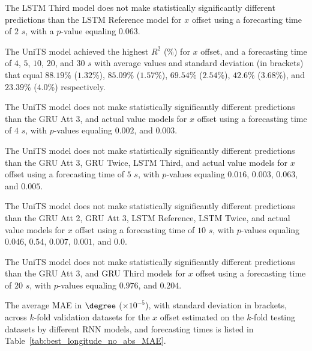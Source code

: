 The LSTM Third model does not make statistically significantly different predictions than the LSTM Reference model for $x$ offset using a forecasting time of $2$ $s$, with a $p$-value equaling $0.063$.

The UniTS model achieved the highest $R^{2}$ (\%) for $x$ offset, and a forecasting time of $4$, $5$, $10$, $20$, and $30$ $s$ with average values and standard deviation (in brackets) that equal $88.19$\% ($1.32$\%), $85.09$\% ($1.57$\%), $69.54$\% ($2.54$\%), $42.6$\% ($3.68$\%), and $23.39$\% ($4.0$\%) respectively.

The UniTS model does not make statistically significantly different predictions than the GRU Att 3, and actual value models for $x$ offset using a forecasting time of $4$ $s$, with $p$-values equaling $0.002$, and $0.003$.

The UniTS model does not make statistically significantly different predictions than the GRU Att 3, GRU Twice, LSTM Third, and actual value models for $x$ offset using a forecasting time of $5$ $s$, with $p$-values equaling $0.016$, $0.003$, $0.063$, and $0.005$.

The UniTS model does not make statistically significantly different predictions than the GRU Att 2, GRU Att 3, LSTM Reference, LSTM Twice, and actual value models for $x$ offset using a forecasting time of $10$ $s$, with $p$-values equaling $0.046$, $0.54$, $0.007$, $0.001$, and $0.0$.

The UniTS model does not make statistically significantly different predictions than the GRU Att 3, and GRU Third models for $x$ offset using a forecasting time of $20$ $s$, with $p$-values equaling $0.976$, and $0.204$.

The average MAE in $\degree$ ($\times 10^{-5}$), with standard deviation in brackets, across $k$-fold validation datasets for the $x$ offset estimated on the $k$-fold testing datasets by different RNN models, and forecasting times is listed in Table~\ref{tab:best_longitude_no_abs_MAE}.

